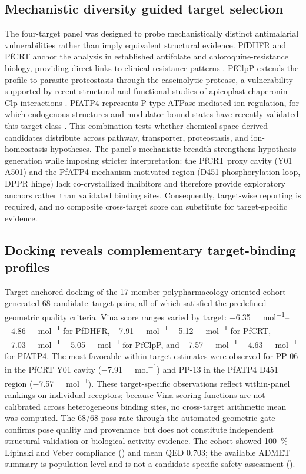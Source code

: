 \documentclass[journal=jcisd8,manuscript=article]{achemso}
\begin{document}
\subsection{Mechanistic diversity guided target selection}
The four-target panel was designed to probe mechanistically distinct antimalarial vulnerabilities rather than imply equivalent structural evidence. PfDHFR and PfCRT anchor the analysis in established antifolate and chloroquine-resistance biology, providing direct links to clinical resistance patterns \cite{Fidock2000,Ariey2014}. PfClpP extends the profile to parasite proteostasis through the caseinolytic protease, a vulnerability supported by recent structural and functional studies of apicoplast chaperonin--Clp interactions \cite{Tissawak2025}. PfATP4 represents P-type ATPase-mediated ion regulation, for which endogenous structures and modulator-bound states have recently validated this target class \cite{Haile2025}. This combination tests whether chemical-space-derived candidates distribute across pathway, transporter, proteostasis, and ion-homeostasis hypotheses. The panel's mechanistic breadth strengthens hypothesis generation while imposing stricter interpretation: the PfCRT proxy cavity (Y01 A501) and the PfATP4 mechanism-motivated region (D451 phosphorylation-loop, DPPR hinge) lack co-crystallized inhibitors and therefore provide exploratory anchors rather than validated binding sites. Consequently, target-wise reporting is required, and no composite cross-target score can substitute for target-specific evidence.

\subsection{Docking reveals complementary target-binding profiles}
Target-anchored docking of the 17-member polypharmacology-oriented cohort generated \num{68} candidate--target pairs, all of which satisfied the predefined geometric quality criteria. Vina score ranges varied by target: \qtyrange{-6.35}{-4.86}{\kilo\calorie\per\mole} for PfDHFR, \qtyrange{-7.91}{-5.12}{\kilo\calorie\per\mole} for PfCRT, \qtyrange{-7.03}{-5.05}{\kilo\calorie\per\mole} for PfClpP, and \qtyrange{-7.57}{-4.63}{\kilo\calorie\per\mole} for PfATP4. The most favorable within-target estimates were observed for PP-06 in the PfCRT Y01 cavity (\num{-7.91}~\si{\kilo\calorie\per\mole}) and PP-13 in the PfATP4 D451 region (\num{-7.57}~\si{\kilo\calorie\per\mole}). These target-specific observations reflect within-panel rankings on individual receptors; because Vina scoring functions are not calibrated across heterogeneous binding sites, no cross-target arithmetic mean was computed. The \num{68}/\num{68} pass rate through the automated geometric gate confirms pose quality and provenance but does not constitute independent structural validation or biological activity evidence. The cohort showed \qty{100}{\percent} Lipinski and Veber compliance () and mean QED \num{0.703}; the available ADMET summary is population-level and is not a candidate-specific safety assessment ().
\end{document}
